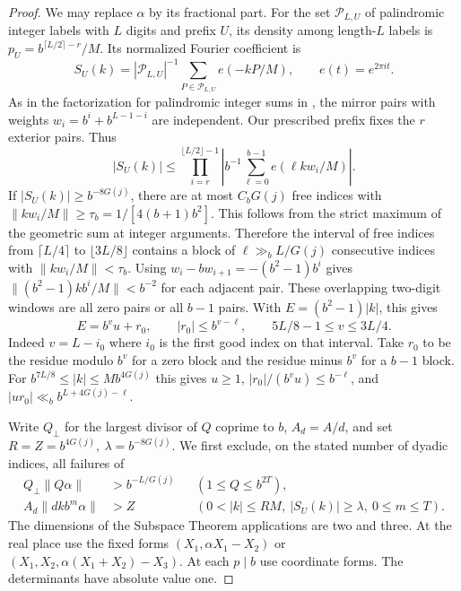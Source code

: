 \begin{proof}
We may replace \(\alpha\) by its fractional part. For the set \(\mathcal P_{L,U}\) of palindromic integer labels with \(L\) digits and prefix \(U\), its density among length-\(L\) labels is \(p_U=b^{\lceil L/2\rceil-r}/M\). Its normalized Fourier coefficient is
\[
 S_U(k)=|\mathcal P_{L,U}|^{-1}
                   \sum_{P\in\mathcal P_{L,U}}e(-kP/M),
 \qquad e(t)=e^{2\pi it}.
\]
As in the factorization for palindromic integer sums in \cite{BHS}, the mirror pairs with weights \(w_i=b^i+b^{L-1-i}\) are independent. Our prescribed prefix fixes the \(r\) exterior pairs. Thus
\[
 |S_U(k)|\le
   \prod_{i=r}^{\lfloor L/2\rfloor-1}
   \left|b^{-1}\sum_{\ell=0}^{b-1}e(\ell k w_i/M)\right|.
\]
If \(|S_U(k)|\ge b^{-8G(j)}\), there are at most \(C_bG(j)\) free indices with \(\|kw_i/M\|\ge \tau_b=1/[4(b+1)b^2]\). This follows from the strict maximum of the geometric sum at integer arguments. Therefore the interval of free indices from \(\lceil L/4\rceil\) to \(\lfloor3L/8\rfloor\) contains a block of \(\ell\gg_b L/G(j)\) consecutive indices with \(\|kw_i/M\|<\tau_b\). Using
\(w_i-bw_{i+1}=-(b^2-1)b^i\) gives \(\|(b^2-1)k b^i/M\|<b^{-2}\) for each adjacent pair. These overlapping two-digit windows are all zero pairs or all \(b-1\) pairs. With \(E=(b^2-1)|k|\), this gives
\begin{equation}\label{eq:pal-spectrum-split}
 E=b^v u+r_0,\qquad |r_0|\le b^{v-\ell},\qquad
                       5L/8-1\le v\le3L/4 .
\end{equation}
Indeed \(v=L-i_0\) where \(i_0\) is the first good index on that interval. Take \(r_0\) to be the residue modulo \(b^v\) for a zero block and the residue minus \(b^v\) for a \(b-1\) block. For \(b^{7L/8}\le|k|\le M b^{4G(j)}\) this gives \(u\ge1\), \(|r_0|/(b^v u)\le b^{-\ell}\), and \(|u r_0|\ll_b b^{L+4G(j)-\ell}\).

Write \(Q_\perp\) for the largest divisor of \(Q\) coprime to \(b\), \(A_d=A/d\), and set \(R=Z=b^{4G(j)},\ \lambda=b^{-8G(j)}\). We first exclude, on the stated number of dyadic indices, all failures of
\begin{align}
 Q_\perp\|Q\alpha\|&> b^{-L/G(j)}
                       &&(1\le Q\le b^{2T}),                     \label{eq:pal-denom}\\
 A_d\|dk b^m\alpha\|&>Z
       &&(0<|k|\le RM,\ |S_U(k)|\ge\lambda,\ 0\le m\le T).
                                                               \label{eq:pal-resonance}
\end{align}
The dimensions of the Subspace Theorem applications are two and three. At the real place use the fixed forms \((X_1,\alpha X_1-X_2)\) or \((X_1,X_2,\alpha(X_1+X_2)-X_3)\). At each \(p\mid b\) use coordinate forms. The determinants have absolute value one.


\end{proof}
